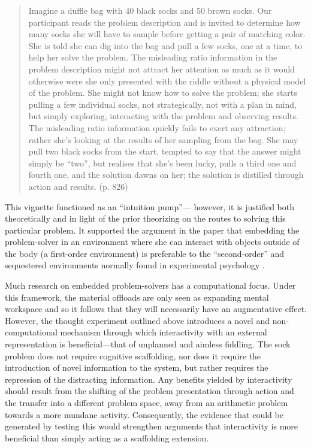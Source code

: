 \documentclass[twocolumn, serif, empirical, authordate]{jote-article}
\begin{document}
  \begin{quote}
Imagine a duffle bag with 40 black socks and 50 brown socks. Our participant reads the problem description and is invited to determine how many socks she will have to sample before getting a pair of matching color. She is told she can dig into the bag and pull a few socks, one at a time, to help her solve the problem. The misleading ratio information in the problem description might not attract her attention as much as it would otherwise were she only presented with the riddle without a physical model of the problem. She might not know how to solve the problem; she starts pulling a few individual socks, not strategically, not with a plan in mind, but simply exploring, interacting with the problem and observing results. The misleading ratio information quickly fails to exert any attraction; rather she's looking at the results of her sampling from the bag. She may pull two black socks from the start, tempted to say that the answer might simply be ``two'', but realises that she's been lucky, pulls a third one and fourth one, and the solution dawns on her; the solution is distilled through action and results. (p. 826) 
\baselineskip
  \end{quote}

This vignette functioned as an ``intuition pump''--- however, it is justified both theoretically and in light of the prior theorizing on the routes to solving this particular problem. It supported the argument in the paper that embedding the problem-solver in an environment where she can interact with objects outside of the body (a first-order environment) is preferable to the ``second-order'' and sequestered environments normally found in experimental psychology \parencite{Vallee-Tourangeau2014,Vallee-Tourangeau2020a}. 


Much research on embedded problem-solvers has a computational focus. Under this framework, the material offloads are only seen as expanding mental workspace and so it follows that they will necessarily have an augmentative effect. However, the thought experiment outlined above introduces a novel and non-computational mechanism through which interactivity with an external representation is beneficial---that of unplanned and aimless fiddling. The sock problem does not require cognitive scaffolding, nor does it require the introduction of novel information to the system, but rather requires the repression of the distracting information. Any benefits yielded by interactivity should result from the shifting of the problem presentation through action and the transfer into a different problem space, away from an arithmetic problem towards a more mundane activity. Consequently, the evidence that could be generated by testing this would strengthen arguments that interactivity is more beneficial than simply acting as a scaffolding extension. 
\end{document}
